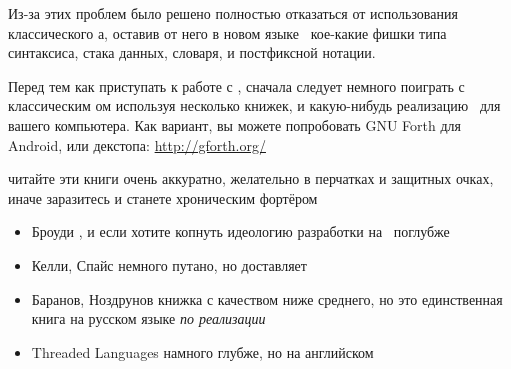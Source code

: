 \noindent
Из-за этих проблем было решено полностью отказаться от использования
классического \F а, оставив от него в новом языке \metal\ кое-какие фишки типа
синтаксиса, стака данных, словаря, и постфиксной нотации.

\clearpage
Перед тем как приступать к работе с \metal, сначала следует немного поиграть с
классическим \F ом используя несколько книжек, и какую-нибудь реализацию \F\ для
вашего компьютера. Как вариант, вы можете попробовать GNU Forth для Android, или
декстопа: \url{http://gforth.org/}

\begin{framed}\noindent
читайте эти книги очень аккуратно, желательно в перчатках и защитных очках,
иначе заразитесь и станете хроническим фортёром
\end{framed}

\begin{itemize}[nosep]
  \item Броуди \cite{starting}, и \cite{thinking} если хотите копнуть идеологию
  разработки на \F\ поглубже
  \item Келли, Спайс \cite{kelly} немного путано, но доставляет
  \item Баранов, Ноздрунов \cite{baranov} книжка с качеством ниже среднего, но
  это единственная книга на русском языке \emph{по реализации} \F
  \item Threaded Languages \cite{threaded} намного глубже, но на английском
\end{itemize}

\secup
